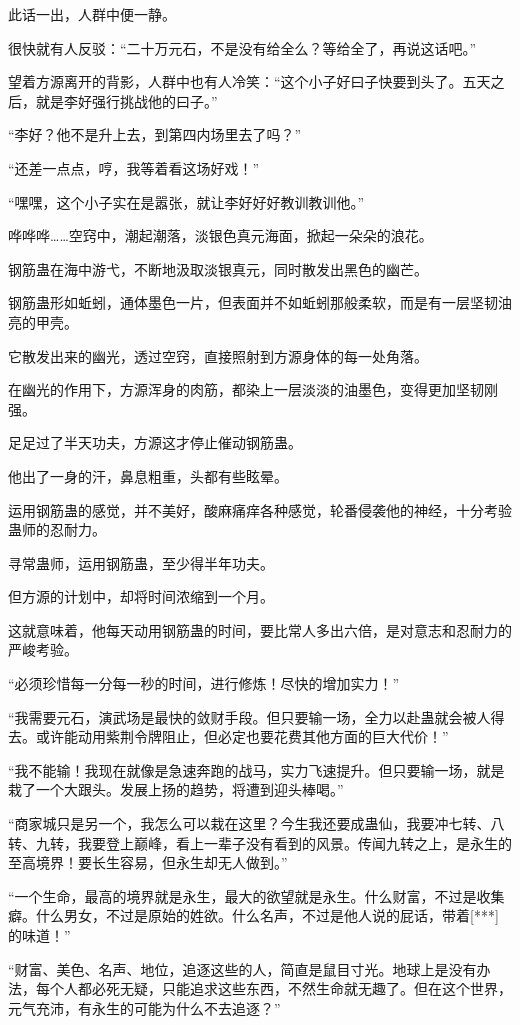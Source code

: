 \begin{this_body}
此话一出，人群中便一静。

很快就有人反驳：“二十万元石，不是没有给全么？等给全了，再说这话吧。”

望着方源离开的背影，人群中也有人冷笑：“这个小子好曰子快要到头了。五天之后，就是李好强行挑战他的曰子。”

“李好？他不是升上去，到第四内场里去了吗？”

“还差一点点，哼，我等着看这场好戏！”

“嘿嘿，这个小子实在是嚣张，就让李好好好教训教训他。”

哗哗哗……空窍中，潮起潮落，淡银色真元海面，掀起一朵朵的浪花。

钢筋蛊在海中游弋，不断地汲取淡银真元，同时散发出黑色的幽芒。

钢筋蛊形如蚯蚓，通体墨色一片，但表面并不如蚯蚓那般柔软，而是有一层坚韧油亮的甲壳。

它散发出来的幽光，透过空窍，直接照射到方源身体的每一处角落。

在幽光的作用下，方源浑身的肉筋，都染上一层淡淡的油墨色，变得更加坚韧刚强。

足足过了半天功夫，方源这才停止催动钢筋蛊。

他出了一身的汗，鼻息粗重，头都有些眩晕。

运用钢筋蛊的感觉，并不美好，酸麻痛痒各种感觉，轮番侵袭他的神经，十分考验蛊师的忍耐力。

寻常蛊师，运用钢筋蛊，至少得半年功夫。

但方源的计划中，却将时间浓缩到一个月。

这就意味着，他每天动用钢筋蛊的时间，要比常人多出六倍，是对意志和忍耐力的严峻考验。

“必须珍惜每一分每一秒的时间，进行修炼！尽快的增加实力！”

“我需要元石，演武场是最快的敛财手段。但只要输一场，全力以赴蛊就会被人得去。或许能动用紫荆令牌阻止，但必定也要花费其他方面的巨大代价！”

“我不能输！我现在就像是急速奔跑的战马，实力飞速提升。但只要输一场，就是栽了一个大跟头。发展上扬的趋势，将遭到迎头棒喝。”

“商家城只是另一个，我怎么可以栽在这里？今生我还要成蛊仙，我要冲七转、八转、九转，我要登上巅峰，看上一辈子没有看到的风景。传闻九转之上，是永生的至高境界！要长生容易，但永生却无人做到。”

“一个生命，最高的境界就是永生，最大的欲望就是永生。什么财富，不过是收集癖。什么男女，不过是原始的姓欲。什么名声，不过是他人说的屁话，带着[***]的味道！”

“财富、美色、名声、地位，追逐这些的人，简直是鼠目寸光。地球上是没有办法，每个人都必死无疑，只能追求这些东西，不然生命就无趣了。但在这个世界，元气充沛，有永生的可能为什么不去追逐？”


\end{this_body}
